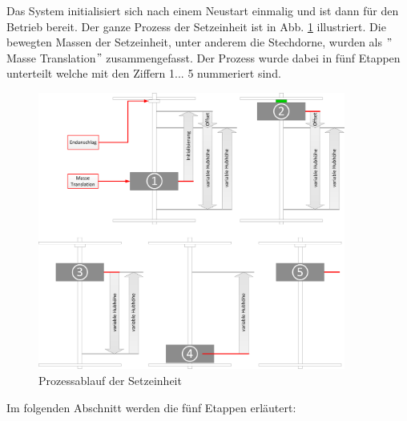 Das System initialisiert sich nach einem Neustart einmalig und ist dann für den Betrieb bereit. Der ganze Prozess der Setzeinheit ist in Abb. \ref{fig:Prozessablauf_Setzeinheit} illustriert. Die bewegten Massen der Setzeinheit, unter anderem die Stechdorne, wurden als $"$Masse Translation$"$ zusammengefasst. Der Prozess wurde dabei in fünf Etappen unterteilt welche mit den Ziffern 1... 5 nummeriert sind.

\begin{figure}[H]
	\includegraphics[width=0.9\textwidth]{Illustrationen/6-Umsetzung/Prozessablauf_Setzeinheit.png}
	\caption{Prozessablauf der Setzeinheit}
	\label{fig:Prozessablauf_Setzeinheit}
\end{figure}

Im folgenden Abschnitt werden die fünf Etappen erläutert:

